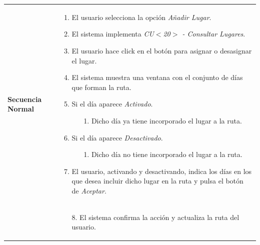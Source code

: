 \begin{longtable}{| p{4cm} | p{10cm} |}
\hline
\textbf{Secuencia Normal} &\mbox{}\par\vspace{-\baselineskip}
\begin{enumerate}[leftmargin=0.7cm, topsep=0.1cm]
\item El usuario selecciona la opción \textit{Añadir Lugar}.
\item El sistema implementa \textit{CU$<$20$>$ - Consultar Lugares}.
\item El usuario hace click en el botón para asignar o desasignar el lugar.
\item El sistema muestra una ventana con el conjunto de días que forman la ruta.
\item Si el día aparece \textit{Activado}.
	\begin{itemize}
	\item[1.] Dicho día ya tiene incorporado el lugar a la ruta.
	\end{itemize}
\item Si el día aparece \textit{Desactivado}.
	\begin{itemize}
	\item[1.] Dicho día no tiene incorporado el lugar a la ruta.
	\end{itemize}
\item El usuario, activando y desactivando, indica los días en los que desea incluir dicho lugar en la ruta y pulsa el botón de \textit{Aceptar}.
\end{enumerate}
\\ &\mbox{}\par\vspace{-\baselineskip}	
\begin{enumerate}[leftmargin=0.7cm, topsep=0.1cm]
\item[8.] El sistema confirma la acción y actualiza la ruta del usuario.

\end{enumerate}



\end{longtable}
